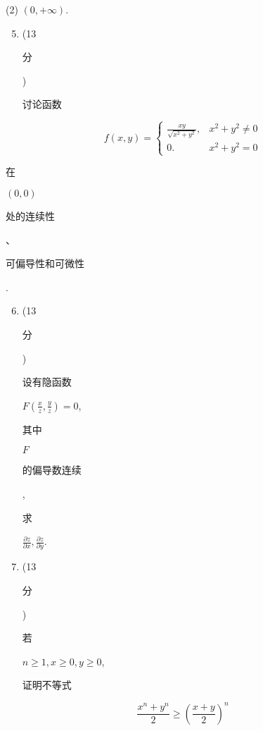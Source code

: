 \documentclass[10pt]{article}
\begin{document}
(2) $(0,+\infty)$.

\begin{enumerate}
  \setcounter{enumi}{4}
  \item (13 \begin{CJK}{UTF8}{mj}分\end{CJK}) \begin{CJK}{UTF8}{mj}讨论函数\end{CJK}
\end{enumerate}
$$
f(x, y)= \begin{cases}\frac{x y}{\sqrt{x^{2}+y^{2}}}, & x^{2}+y^{2} \neq 0 \\ 0 . & x^{2}+y^{2}=0\end{cases}
$$
\begin{CJK}{UTF8}{mj}在\end{CJK} $(0,0)$ \begin{CJK}{UTF8}{mj}处的连续性\end{CJK}、\begin{CJK}{UTF8}{mj}可偏导性和可微性\end{CJK}.

\begin{enumerate}
  \setcounter{enumi}{5}
  \item (13 \begin{CJK}{UTF8}{mj}分\end{CJK}) \begin{CJK}{UTF8}{mj}设有隐函数\end{CJK} $F\left(\frac{x}{z}, \frac{y}{z}\right)=0$, \begin{CJK}{UTF8}{mj}其中\end{CJK} $F$ \begin{CJK}{UTF8}{mj}的偏导数连续\end{CJK}, \begin{CJK}{UTF8}{mj}求\end{CJK} $\frac{\partial z}{\partial x}, \frac{\partial z}{\partial y}$.

  \item (13 \begin{CJK}{UTF8}{mj}分\end{CJK}) \begin{CJK}{UTF8}{mj}若\end{CJK} $n \geqslant 1, x \geqslant 0, y \geqslant 0$, \begin{CJK}{UTF8}{mj}证明不等式\end{CJK}

\end{enumerate}
$$
\frac{x^{n}+y^{n}}{2} \geqslant\left(\frac{x+y}{2}\right)^{n}
$$
\end{document}
